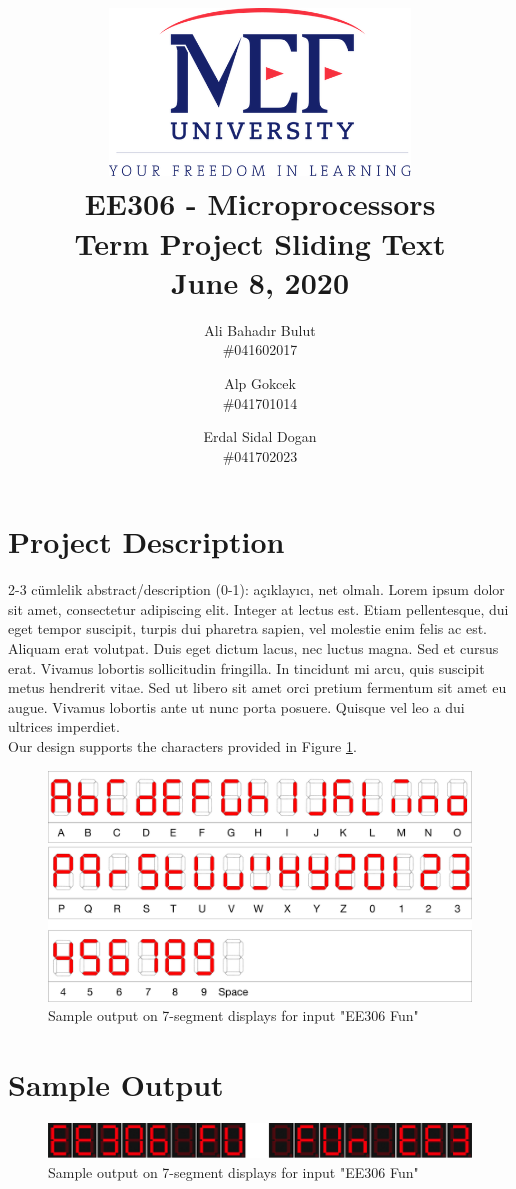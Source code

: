 \documentclass[titlepage]{article}
\date{}
\author{Ali Bahadır Bulut\\ \#041602017  \and Alp
	Gokcek \\ \#041701014 \and Erdal Sidal Dogan \\ \#041702023}
\title{\includegraphics[width=0.6\textwidth]{../images/logo_en_color.png}\\ 
\vspace{5em}
EE306 - Microprocessors\\
\vspace{2em}
\textbf{Term Project \linebreak Sliding Text
}\\
\vspace{1.5em}
June 8, 2020}
\begin{document}
	\maketitle
	\section{Project Description}
	2-3 cümlelik abstract/description (0-1): açıklayıcı, net olmalı.
	Lorem ipsum dolor sit amet, consectetur adipiscing elit. Integer at lectus est. Etiam pellentesque, dui eget tempor suscipit, turpis dui pharetra sapien, vel molestie enim felis ac est. Aliquam erat volutpat. Duis eget dictum lacus, nec luctus magna. Sed et cursus erat. Vivamus lobortis sollicitudin fringilla. In tincidunt mi arcu, quis suscipit metus hendrerit vitae. Sed ut libero sit amet orci pretium fermentum sit amet eu augue. Vivamus lobortis ante ut nunc porta posuere. Quisque vel leo a dui ultrices imperdiet.\\
	
	Our design supports the characters provided in Figure \ref{supported_chars}.\\
	
	\begin{figure}[h]
		\centering
		\includegraphics[scale=.1]{../images/supported_chars.pdf}
		\caption{Sample output on 7-segment displays for input "EE306 Fun"}
		\label{supported_chars}
	\end{figure}
	\section{Sample Output}
	\begin{figure}[h!]
		\centering
		\includegraphics[scale=.45]{../images/fig1.png}
		\caption{Sample output on 7-segment displays for input "EE306 Fun"}
	\end{figure}
\end{document}
